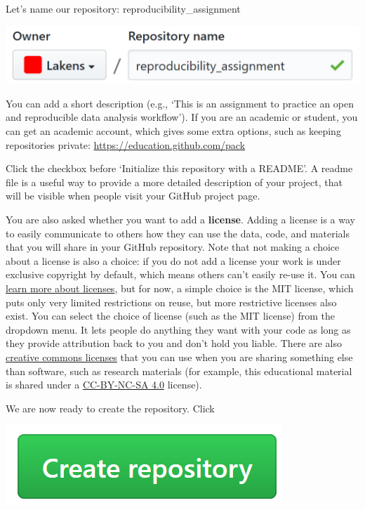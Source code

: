 \documentclass[
  oneside]{krantz}
\begin{document}
Let's name our repository: reproducibility\_assignment

\begin{center}\includegraphics[width=1\linewidth]{images/5cddb5d5a5ef1b470b5d160857a71719} \end{center}

You can add a short description (e.g., `This is an assignment to practice an
open and reproducible data analysis workflow'). If you are an academic or
student, you can get an academic account, which gives some extra options, such
as keeping repositories private: \url{https://education.github.com/pack}

Click the checkbox before `Initialize this repository with a README'. A readme
file is a useful way to provide a more detailed description of your project,
that will be visible when people visit your GitHub project page.

You are also asked whether you want to add a \textbf{license}. Adding a license is a way to easily communicate to others how they can use the data, code, and materials that you will share in your GitHub repository. Note that not making a choice about a license is also a choice: if you do not add a license your work is under exclusive copyright by default, which means others can't easily re-use it. You can \href{https://choosealicense.com/}{learn more about licenses}, but for now, a simple choice is the MIT license, which puts only very limited restrictions on reuse, but more restrictive licenses also exist. You can select the choice of license (such as the MIT license) from the dropdown menu. It lets people do anything they want with your code as long as they provide attribution back to you and don't hold you liable. There are also \href{https://creativecommons.org/choose/}{creative commons
licenses} that you can use when you are sharing something else than software, such as research materials (for example, this educational material is shared under a \href{https://creativecommons.org/licenses/by-nc-sa/4.0}{CC-BY-NC-SA 4.0} license).

We are now ready to create the repository. Click

\begin{center}\includegraphics[width=0.2\linewidth]{images/ccb66558822a17c4a3ec6511c9bf5a7b} \end{center}
\end{document}
